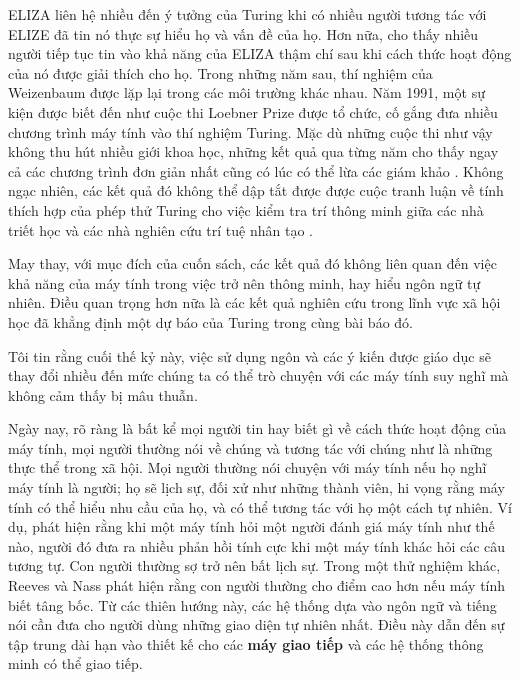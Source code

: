 ELIZA liên hệ nhiều đến ý tưởng của Turing khi có nhiều người tương tác với ELIZE đã tin nó thực sự hiểu họ và vấn đề của họ. Hơn nữa, \citet{weizenbaum1976computer} cho thấy nhiều người tiếp tục tin vào khả năng của ELIZA thậm chí sau khi cách thức hoạt động của nó được giải thích cho họ. Trong những năm sau, thí nghiệm của Weizenbaum được lặp lại trong các môi trường khác nhau. Năm 1991, một sự kiện được biết đến như cuộc thi Loebner Prize được tổ chức, cố gắng đưa nhiều chương trình máy tính vào thí nghiệm Turing. Mặc dù những cuộc thi như vậy không thu hút nhiều giới khoa học, những kết quả qua từng năm cho thấy ngay cả các chương trình đơn giản nhất cũng có lúc có thể lừa các giám khảo \citep{shieber1994lessons}. Không ngạc nhiên, các kết quả đó không thể dập tắt được được cuộc tranh luận về tính thích hợp của phép thử Turing cho việc kiểm tra trí thông minh giữa các nhà triết học và các nhà nghiên cứu trí tuệ nhân tạo \citep{searle1980minds}.

May thay, với mục đích của cuốn sách, các kết quả đó không liên quan đến việc khả năng của máy tính trong việc trở nên thông minh, hay hiểu ngôn ngữ tự nhiên. Điều quan trọng hơn nữa là các kết quả nghiên cứu trong lĩnh vực xã hội học đã khẳng định một dự báo của Turing trong cùng bài báo đó.

\begin{adjustwidth}{1.5cm}{}
Tôi tin rằng cuối thế kỷ này, việc sử dụng ngôn và các ý kiến được giáo dục sẽ thay đổi nhiều đến mức chúng ta có thể trò chuyện với các máy tính suy nghĩ mà không cảm thấy bị mâu thuẫn.
\end{adjustwidth}

Ngày nay, rõ ràng là bất kể mọi người tin hay biết gì về cách thức hoạt động của máy tính, mọi người thường nói về chúng và tương tác với chúng như là những thực thể trong xã hội. Mọi người thường nói chuyện với máy tính nếu họ nghĩ máy tính là người; họ sẽ lịch sự, đối xử như những thành viên, hi vọng rằng máy tính có thể hiểu nhu cầu của họ, và có thể tương tác với họ một cách tự nhiên. Ví dụ, \citet*{reeves1996media} phát hiện rằng khi một máy tính hỏi một người đánh giá máy tính như thế nào, người đó đưa ra nhiều phản hồi tính cực khi một máy tính khác hỏi các câu tương tự. Con người thường sợ trở nên bất lịch sự. Trong một thử nghiệm khác, Reeves và Nass phát hiện rằng con người thường cho điểm cao hơn nếu máy tính biết tâng bốc. Từ các thiên hướng này, các hệ thống dựa vào ngôn ngữ và tiếng nói cần đưa cho người dùng những giao diện tự nhiên nhất. Điều này dẫn đến sự tập trung dài hạn vào thiết kế cho các \textbf{máy giao tiếp} và các hệ thống thông minh có thể giao tiếp.

